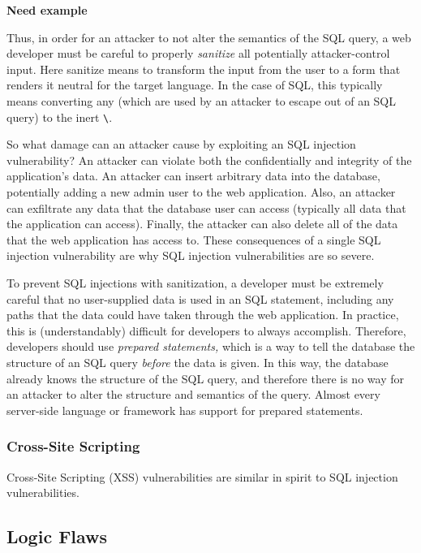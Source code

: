 \textbf{Need example}

Thus, in order for an attacker to not alter the semantics of the SQL
query, a web developer must be careful to properly \emph{sanitize} all
potentially attacker-control input. Here sanitize means to transform
the input from the user to a form that renders it neutral for the
target language. In the case of SQL, this typically means converting
any \texttt{\textquotesingle} (which are used by an attacker to escape
out of an SQL query) to the inert
\texttt{\textbackslash\textquotesingle}.

So what damage can an attacker cause by exploiting an SQL injection
vulnerability? An attacker can violate both the confidentially and
integrity of the application's data. An attacker can insert arbitrary
data into the database, potentially adding a new admin user to the web
application. Also, an attacker can exfiltrate any data that the
database user can access (typically all data that the application can
access). Finally, the attacker can also delete all of the data that
the web application has access to. These consequences of a single SQL
injection vulnerability are why SQL injection vulnerabilities are so
severe.

To prevent SQL injections with sanitization, a developer must be
extremely careful that no user-supplied data is used in an SQL
statement, including any paths that the data could have taken through
the web application. In practice, this is (understandably) difficult
for developers to always accomplish. Therefore, developers should use
\emph{prepared statements,} which is a way to tell the database the
structure of an SQL query \emph{before} the data is given. In this
way, the database already knows the structure of the SQL query, and
therefore there is no way for an attacker to alter the structure and
semantics of the query. Almost every server-side language or framework
has support for prepared statements.

\subsubsection{Cross-Site Scripting}

Cross-Site Scripting (XSS) vulnerabilities are similar in spirit to
SQL injection vulnerabilities. 

\subsection{Logic Flaws}

